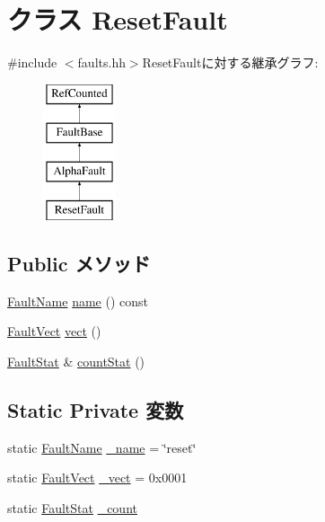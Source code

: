 \hypertarget{classAlphaISA_1_1ResetFault}{
\section{クラス ResetFault}
\label{classAlphaISA_1_1ResetFault}
}


{\ttfamily \#include $<$faults.hh$>$}ResetFaultに対する継承グラフ:\begin{figure}[H]
\begin{center}
\leavevmode
\includegraphics[height=4cm]{classAlphaISA_1_1ResetFault}
\end{center}
\end{figure}
\subsection*{Public メソッド}
\begin{DoxyCompactItemize}
\item 
\hyperlink{sim_2faults_8hh_abb196df64725e5c2568c900cf130d8d7}{FaultName} \hyperlink{classAlphaISA_1_1ResetFault_a73adb23259baf912a81683a9790a303f}{name} () const 
\item 
\hyperlink{classm5_1_1params_1_1Addr}{FaultVect} \hyperlink{classAlphaISA_1_1ResetFault_ae15c5d7ab0162821b93d668d0b225198}{vect} ()
\item 
\hyperlink{classStats_1_1Scalar}{FaultStat} \& \hyperlink{classAlphaISA_1_1ResetFault_a6c79663c761ff57265459f7e3aefaf4c}{countStat} ()
\end{DoxyCompactItemize}
\subsection*{Static Private 変数}
\begin{DoxyCompactItemize}
\item 
static \hyperlink{sim_2faults_8hh_abb196df64725e5c2568c900cf130d8d7}{FaultName} \hyperlink{classAlphaISA_1_1ResetFault_ac79073ffcd2c66a09bcd3bd3ad206019}{\_\-name} = \char`\"{}reset\char`\"{}
\item 
static \hyperlink{classm5_1_1params_1_1Addr}{FaultVect} \hyperlink{classAlphaISA_1_1ResetFault_ad9e5855b9db0b2824cf6c507be4a872e}{\_\-vect} = 0x0001
\item 
static \hyperlink{classStats_1_1Scalar}{FaultStat} \hyperlink{classAlphaISA_1_1ResetFault_a4bff925c412f331c5aaf6a39b79619ff}{\_\-count}
\end{DoxyCompactItemize}


